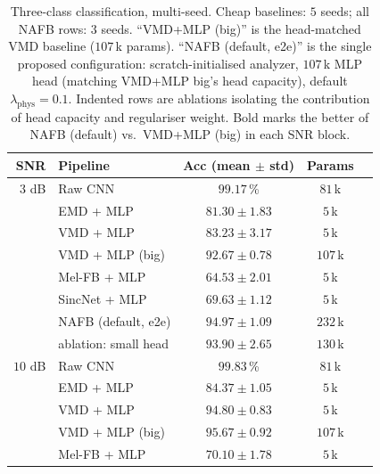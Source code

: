 \documentclass[journal]{IEEEtran}
\theoremstyle{remark}
\begin{document}
\begin{table}[t]
\centering
\caption{Three-class classification, multi-seed. Cheap baselines:
$5$ seeds; all NAFB rows: $3$ seeds. ``VMD+MLP (big)'' is the
head-matched VMD baseline ($107$\,k params). ``NAFB (default,
e2e)'' is the single proposed configuration: scratch-initialised
analyzer, $107$\,k MLP head (matching VMD+MLP big's head capacity),
default $\lambda_{\text{phys}} = 0.1$. Indented rows are ablations
isolating the contribution of head capacity and regulariser weight.
Bold marks the better of NAFB (default) vs.\ VMD+MLP (big) in each
SNR block.}
\label{tab:snr-sweep}
\setlength{\tabcolsep}{3.5pt}
\begin{tabular}{rlccr}
\toprule
SNR    & Pipeline                          & Acc (mean $\pm$ std)                & Params \\
\midrule
$3$ dB & Raw CNN                           & $99.17$\,\%                         & $81$\,k  \\
       & EMD + MLP                         & $81.30 \pm 1.83$                    & $5$\,k   \\
       & VMD + MLP                         & $83.23 \pm 3.17$                    & $5$\,k   \\
       & VMD + MLP (big)                   & $92.67 \pm 0.78$                    & $107$\,k \\
       & Mel-FB + MLP                      & $64.53 \pm 2.01$                    & $5$\,k   \\
       & SincNet + MLP                     & $69.63 \pm 1.12$                    & $5$\,k   \\
       & NAFB (default, e2e)               & $\mathbf{94.97 \pm 1.09}$           & $232$\,k \\
       & \quad ablation: small head        & $93.90 \pm 2.65$                    & $130$\,k \\
\midrule
$10$ dB & Raw CNN                          & $99.83$\,\%                         & $81$\,k  \\
       & EMD + MLP                         & $84.37 \pm 1.05$                    & $5$\,k   \\
       & VMD + MLP                         & $94.80 \pm 0.83$                    & $5$\,k   \\
       & VMD + MLP (big)                   & $\mathbf{95.67 \pm 0.92}$           & $107$\,k \\
       & Mel-FB + MLP                      & $70.10 \pm 1.78$                    & $5$\,k   \\

\end{tabular}
\end{table}
\end{document}
